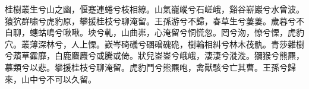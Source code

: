 
\begin{pinyinscope}
桂樹叢生兮山之幽，偃蹇連蜷兮枝相繚。山氣巃嵷兮石嵯峨，谿谷嶄巖兮水曾波。猿狖群嘯兮虎豹原，攀援桂枝兮聊淹留。王孫游兮不歸，春草生兮萋萋。歲暮兮不自聊，蟪蛄鳴兮啾啾。坱兮軋，山曲岪，心淹留兮恫慌忽。罔兮沕，憭兮慄，虎豹穴。叢薄深林兮，人上慄。嶔岑碕礒兮碅磳磈硊，樹輪相糾兮林木茷骫。青莎雜樹兮薠草靃靡，白鹿麔麚兮或騰或倚。狀兒崟崟兮峨峨，淒淒兮漇漇。獼猴兮熊羆，慕類兮以悲。攀援桂枝兮聊淹留。虎豹鬥兮熊羆咆，禽獸駭兮亡其曹。王孫兮歸來，山中兮不可以久留。


\end{pinyinscope}